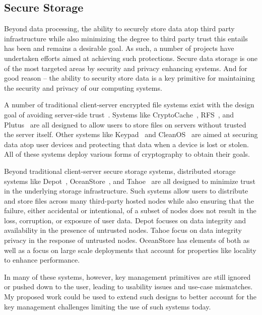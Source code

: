 \subsection{Secure Storage}

Beyond data processing, the ability to securely store data atop third
party infrastructure while also minimizing the degree to third party
trust this entails has been and remains a desirable goal. As such, a
number of projects have undertaken efforts aimed at achieving such
protections.  Secure data storage is one of the most targeted areas by
security and privacy enhancing systems. And for good reason -- the
ability to security store data is a key primitive for maintaining the
security and privacy of our computing systems.

A number of traditional client-server encrypted file systems exist
with the design goal of avoiding server-side
trust~\cite{Kher2005}. Systems like CryptoCache~\cite{jensen2000},
RFS~\cite{dong2011}, and Plutus~\cite{kallahalla2003} are all designed
to allow users to store files on servers without trusted the server
itself. Other systems like Keypad~\cite{geambasu2011} and
CleanOS~\cite{tang2012} are aimed at securing data atop user devices
and protecting that data when a device is lost or stolen. All of these
systems deploy various forms of cryptography to obtain their goals.
 
Beyond traditional client-server secure storage systems, distributed
storage systems like Depot~\cite{mahajan2011},
OceanStore~\cite{kubiatowicz2000}, and Tahoe~\cite{wilcox-o'hearn2008}
are all designed to minimize trust in the underlying storage
infrastructure. Such systems allow users to distribute and store files
across many third-party hosted nodes while also ensuring that the
failure, either accidental or intentional, of a subset of nodes does
not result in the loss, corruption, or exposure of user data. Depot
focuses on data integrity and availability in the presence of
untrusted nodes. Tahoe focus on data integrity privacy in the response
of untrusted nodes. OceanStore has elements of both as well as a focus
on large scale deployments that account for properties like locality
to enhance performance.

In many of these systems, however, key management primitives are still
ignored or pushed down to the user, leading to usability issues and
use-case mismatches. My proposed work could be used to extend such
designs to better account for the key management challenges limiting
the use of such systems today.

